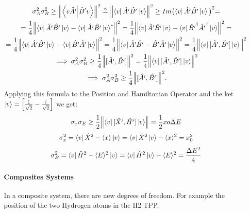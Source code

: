 \documentclass{article}
\begin{document}
\begin{gather*}
  \sigma_A^2\sigma_B^2 \geq  \norm{\bra{v \hat{A'}}\ket{\hat{B}'v} }^2 \triangleq \norm{ \bra{v} \hat{A'}\hat{B'}\ket{v}}^2 \geq  Im \bigl( \bra{v}\hat{A'}\hat{B'} \ket{v} \bigl)^2 = \\ = \frac{1}{4} \norm{ \bra{v}\hat{A'}\hat{B'}\ket{v} - \bra{v}\hat{A'}\hat{B'}\ket{v}^* }^2 
  =\frac{1}{4} \norm{ \bra{v}\hat{A'}\hat{B'}\ket{v} - \bra{v}\hat{B'}^\dag \hat{A'}^\dag \ket{v} }^2= \\ = \frac{1}{4} \norm{ \bra{v}\hat{A'}\hat{B'}\ket{v} - \bra{v}\hat{B'}\hat{A'}\ket{v} }^2  =  \frac{1}{4} \norm{ \bra{v}\hat{A'}\hat{B'} - \hat{B'}\hat{A'}\ket{v} }^2 =\frac{1}{4} \norm{ \bra{v} [\hat{A'},\hat{B'}]\ket{v} }^2 \\ \implies \sigma_A^2\sigma_B^2 \geq   \frac{1}{4} \norm{[\hat{A'},\hat{B'}] }^2 =\frac{1}{4} \norm{ \bra{v} [\hat{A'},\hat{B'}]\ket{v} }^2 \\ \implies \sigma_A^2\sigma_B^2 \geq   \frac{1}{4} \norm{[\hat{A'},\hat{B'}] }^2  . 
\end{gather*}
Applying this formula to the Position and Hamiltonian Operator and the ket $\ket{v} =\Bigl[ \frac{1}{\sqrt{2}} -\frac{i}{\sqrt{2}} \Bigl] $ we get:
$$ \sigma_x \sigma_E \geq \frac{1}{2} \norm{ \bra{v} [\hat{X'},\hat{H'}]\ket{v} } = \frac{1}{2} xo \Delta E$$
$$ \sigma_x^2 = \bra{v} \hat{X}^2 - \langle x \rangle \ket{v} = \bra{v} \hat{X}^2 \ket{v} - \langle x \rangle^2 = x_0^2$$
$$\sigma_E^2 = \bra{v} \hat{H}^2 - \langle E \rangle ^2 \ket{v} = \bra{v} \hat{H}^2 \ket{v} - \langle E \rangle ^2 = \frac{\Delta E^2}{4}$$

\paragraph{Composites Systems}In a composite system, there are new degrees of freedom. For example the position of the two Hydrogen atoms in the H2-TPP. \\ \\
\end{document}
